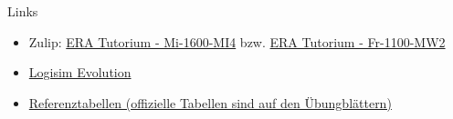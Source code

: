 \documentclass[
  german,            %
  aspectratio=169,    %
]{tumbeamer}
\begin{document}
\begin{frame}[fragile, c]{Links}{}
  \begin{itemize}
    \item Zulip: \href{https://zulip.in.tum.de/#narrow/stream/1917-ERA-Tutorium---Mi-1600-MI4}{\glqq ERA Tutorium - Mi-1600-MI4\grqq}
          bzw. \href{https://zulip.in.tum.de/#narrow/stream/1940-ERA-Tutorium---Fr-1100-MW2}{\glqq ERA Tutorium - Fr-1100-MW2\grqq}
    \item \href{https://github.com/logisim-evolution/logisim-evolution/releases}{Logisim Evolution}
    \item \href{https://courses.edx.org/assets/courseware/v1/f06a2dc0c856f60ec0711e9f5e1c98cf/asset-v1:HarveyMuddX+ENGR85B+1T2023+type@asset+block/FinalReferences.pdf}{Referenztabellen (offizielle Tabellen sind auf den Übungblättern)}
  \end{itemize}
\end{frame}

\maketitle
\end{document}
